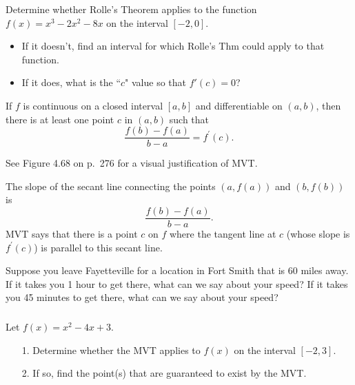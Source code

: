 \documentclass[cal1spr16Lectures.tex]{subfiles}
\begin{document}
\begin{frame}
\begin{exe}
Determine whether Rolle's Theorem applies to the function $f(x)=x^3-2x^2-8x$ on the interval $[-2,0]$.
\begin{itemize}
\item If it doesn't, find an interval for which Rolle's Thm could apply to that function.
\item If it does, what is the ``$c$" value so that $f'(c)=0$?  
\end{itemize}
\end{exe}
\end{frame}

\begin{frame}
\begin{thm}  If $f$ is continuous on a closed interval $[a,b]$ and differentiable on $(a,b)$, then there is at least one point $c$ in $(a,b)$ such that 
\[
\frac{f(b)-f(a)}{b-a}=f^{\prime}(c).
\]
\end{thm}
See Figure 4.68 on p.\ 276 for a visual justification of MVT.
\end{frame}

\begin{frame}\small  
The slope of the secant line connecting the points $(a,f(a))$ and $(b,f(b))$ is 
\[\dfrac{f(b)-f(a)}{b-a}.\]  
MVT says that there is a point $c$ on $f$ where the tangent line at $c$ (whose slope is $f^{\prime}(c)$) is parallel to this secant line.  
\begin{que}
Suppose you leave Fayetteville for a location in Fort Smith that is 60 miles away.  If it takes you 1 hour to get there, what can we say about your speed?  If it takes you 45 minutes to get there, what can we say about your speed?
\end{que}
\end{frame}

\begin{frame}%
\frametitle{}
\begin{ex} Let $f(x)=x^2-4x+3.$
\begin{itemize}
\item[1.] Determine whether the MVT applies to $f(x)$ on the interval $[-2,3]$.
\item[2.] If so, find the point(s) that are guaranteed to exist by the MVT.
\end{itemize}
\end{ex}
\end{frame}
\end{document}
